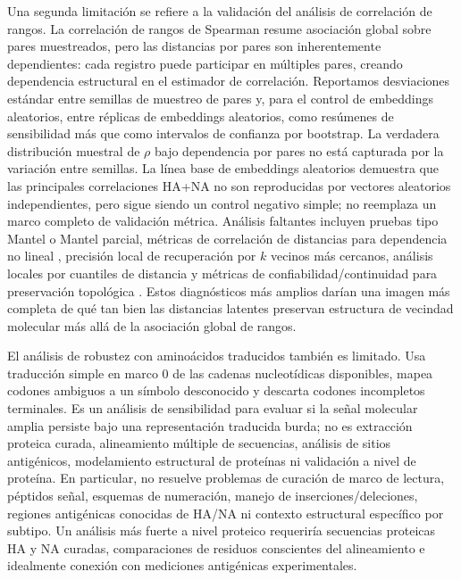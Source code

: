 \documentclass[11pt]{article}
\begin{document}
Una segunda limitación se refiere a la validación del análisis de correlación de rangos. La correlación de rangos de Spearman resume asociación global sobre pares muestreados, pero las distancias por pares son inherentemente dependientes: cada registro puede participar en múltiples pares, creando dependencia estructural en el estimador de correlación. Reportamos desviaciones estándar entre semillas de muestreo de pares y, para el control de embeddings aleatorios, entre réplicas de embeddings aleatorios, como resúmenes de sensibilidad más que como intervalos de confianza por bootstrap. La verdadera distribución muestral de $\rho$ bajo dependencia por pares no está capturada por la variación entre semillas. La línea base de embeddings aleatorios demuestra que las principales correlaciones HA+NA no son reproducidas por vectores aleatorios independientes, pero sigue siendo un control negativo simple; no reemplaza un marco completo de validación métrica. Análisis faltantes incluyen pruebas tipo Mantel o Mantel parcial, métricas de correlación de distancias para dependencia no lineal \cite{szekely2007distance}, precisión local de recuperación por $k$ vecinos más cercanos, análisis locales por cuantiles de distancia y métricas de confiabilidad/continuidad para preservación topológica \cite{lee2009quality}. Estos diagnósticos más amplios darían una imagen más completa de qué tan bien las distancias latentes preservan estructura de vecindad molecular más allá de la asociación global de rangos.

El análisis de robustez con aminoácidos traducidos también es limitado. Usa traducción simple en marco 0 de las cadenas nucleotídicas disponibles, mapea codones ambiguos a un símbolo desconocido y descarta codones incompletos terminales. Es un análisis de sensibilidad para evaluar si la señal molecular amplia persiste bajo una representación traducida burda; no es extracción proteica curada, alineamiento múltiple de secuencias, análisis de sitios antigénicos, modelamiento estructural de proteínas ni validación a nivel de proteína. En particular, no resuelve problemas de curación de marco de lectura, péptidos señal, esquemas de numeración, manejo de inserciones/deleciones, regiones antigénicas conocidas de HA/NA ni contexto estructural específico por subtipo. Un análisis más fuerte a nivel proteico requeriría secuencias proteicas HA y NA curadas, comparaciones de residuos conscientes del alineamiento e idealmente conexión con mediciones antigénicas experimentales.
\end{document}
